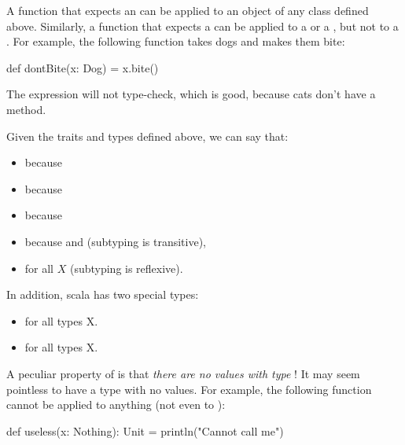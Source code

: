 \documentclass[9pt]{extbook}
\begin{document}
A function that expects an  can be applied to an object
of any class defined above. Similarly, a function that expects a 
can be applied to a  or a , but not to a
. For example, the following function takes dogs and makes
them bite:
\begin{scalacode}
def dontBite(x: Dog) = {
  x.bite()
}
\end{scalacode}

The expression  will not type-check, which
is good, because cats don't have a  method.

Given the traits and types defined above, we can say that:
\begin{itemize}

  \item {} because 

  \item {} because 

  \item {} because 

  \item {} because  and
   (subtyping is transitive),

  \item {} for all $X$ (subtyping is reflexive).

\end{itemize}
%
In addition, scala has two special types:
%
\begin{itemize}

  \item {} for all types X.

  \item {} for all types X.

\end{itemize}

A peculiar property of  is that
\emph{there are no values with type} !
It may seem pointless to have a type with no values. For example, the following
function cannot be applied to anything (not even to ):
\begin{scalacode}
def useless(x: Nothing): Unit = {
  println("Cannot call me")
}
\end{scalacode}
\end{document}
